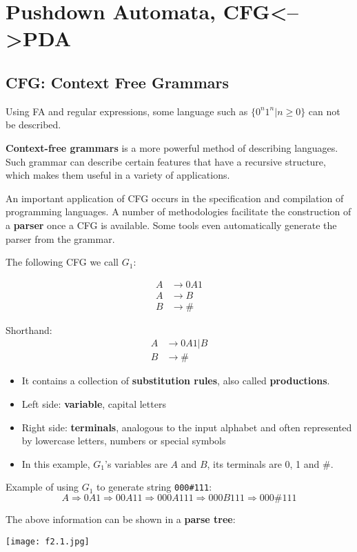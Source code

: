 \chapter{Pushdown Automata, CFG<-->PDA}

\section{CFG: Context Free Grammars}

Using FA and regular expressions, some language such as \(\{ 0^n1^n | n \geq 0 \} \) can not be described. 

\textbf{Context-free grammars}  is a more powerful method of describing languages. Such grammar can describe certain features that have a recursive structure, which makes them useful in a variety of applications.

An important application of CFG occurs in the specification and compilation of programming languages. A number of methodologies facilitate the construction of a \textbf{parser} once a CFG is available. Some tools even automatically generate the parser from the grammar.

\begin{example}
    The following CFG we call \(G_1\):

    \begin{align*}
        A &\rightarrow 0A1 \\
        A &\rightarrow B \\
        B &\rightarrow \# 
    \end{align*}

    Shorthand:
    \begin{align*}
        A &\rightarrow 0A1 | B \\
        B &\rightarrow \# 
    \end{align*}

    \begin{itemize}
        \item It contains a collection of \textbf{substitution rules}, also called \textbf{productions}. 
        \item Left side: \textbf{variable}, capital letters
        \item Right side: \textbf{terminals}, analogous to the input alphabet and often represented by lowercase letters, numbers or special symbols
        \item In this example, \(G_1\)'s variables are \(A\) and \(B\), its terminals are 0, 1 and \(\#\).   
    \end{itemize}

    Example of using \(G_1\) to generate string \verb|000#111|:
    \[
        A \Rightarrow 0A1 
        \Rightarrow 00A11
        \Rightarrow 000A111 
        \Rightarrow 000B111 
        \Rightarrow 000\#111 
    \] 

    The above information can be shown in a \textbf{parse tree}:

    \texttt{[image: f2.1.jpg]}
\end{example}

